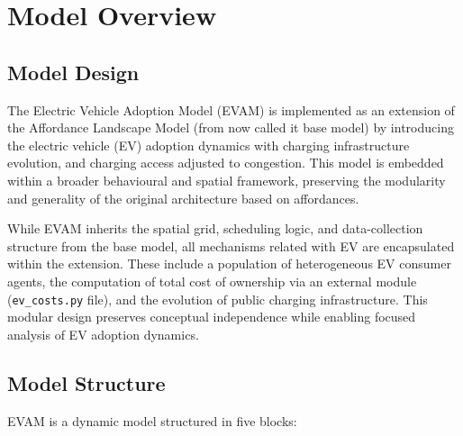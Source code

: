 \documentclass[11pt]{article}
\begin{document}
\section{Model Overview}

\subsection{Model Design}

The Electric Vehicle Adoption Model (EVAM) is implemented as an extension of
the Affordance Landscape Model (from now called it base model) by
introducing the electric vehicle (EV) adoption dynamics with charging
infrastructure evolution, and charging access adjusted to congestion. This
model is embedded within a broader behavioural and spatial framework,
preserving the modularity and generality of the original architecture based
on affordances.

While EVAM inherits the spatial grid, scheduling logic, and data-collection
structure from the base model, all mechanisms related with EV are
encapsulated within the extension. These include a population of
heterogeneous EV consumer agents, the computation of total cost of ownership
via an external module (\texttt{ev\_costs.py} file), and the evolution of
public charging infrastructure. This modular design preserves conceptual
independence while enabling focused analysis of EV adoption dynamics.

\subsection{Model Structure}

EVAM is a dynamic model structured in five blocks:
\end{document}
